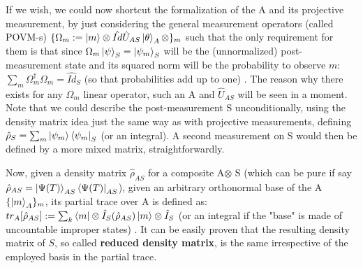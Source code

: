 \documentclass[11pt, a4paper]{article} %
\begin{document}
If we wish, we could now shortcut the formalization of the A and its projective measurement, by just considering the general measurement operators (called POVM-s) $\{\Omega_m:=\ket{m}\otimes\hat{Id}\hat{U}_{AS}\ket{\theta}_A\otimes\}_m$ such that the only requirement for them is that since $\Omega_m\ket{\psi}_S=\ket{\psi_m}_S$ will be the (unnormalized) post-measurement state and its squared norm will be the probability to observe $m$: $\sum_m \Omega_m^\dagger\Omega_m=\hat{Id}_S$ (so that probabilities add up to one) \cite{Generalized, Durr}. The reason why there exists for any $\Omega_m$ linear operator, such an A and $\hat{U}_{AS}$ will be seen in a moment. Note that we could describe the post-measurement S unconditionally, using the density matrix idea just the same way as with projective measurements, defining $\hat{\rho}_S=\sum_m \ket{\psi_m}\bra{\psi_m}_S$ (or an integral). A second measurement on S would then be defined by a more mixed matrix, straightforwardly.

Now, given a density matrix $\hat{\rho}_{AS}$ for a composite A$\otimes$ S (which can be pure if say $\hat{\rho}_{AS}=\ket{\Psi(T)}_{AS}\bra{\Psi(T)}_{AS}$), given an arbitrary orthonormal base of the A $\{\ket{m}_A\}_m$, its partial trace over A is defined as: $tr_{A}[\hat{\rho}_{AS}] := \sum_k \bra{m}\otimes \hat{I}_S(\hat{\rho}_{AS})\ket{m}\otimes \hat{I}_S$ (or an integral if the "base" is made of uncountable improper states) \cite{Generalized, Durr}. It can be easily proven that the resulting density matrix of $S$, so called {\bf reduced density matrix}, is the same irrespective of the employed basis in the partial trace. 
\end{document}
